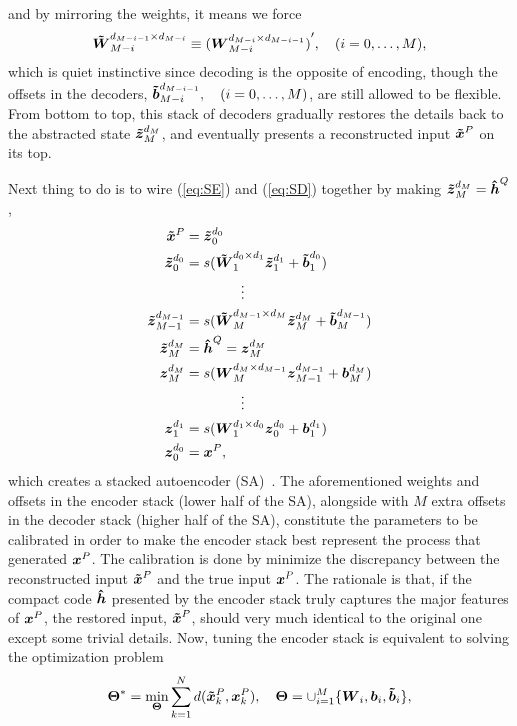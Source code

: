 and by mirroring the weights, it means we force
\begin{align}
  \boldsymbol{\tilde{W}}_{M-i}^{d_{M-i-1} \times d_{M-i}} \equiv {(\boldsymbol{W}_{M-i}^{d_{M-i} \times d_{M-i-1}})}^\prime, \quad (i=0, \dots, M),
\end{align}
which is quiet instinctive since decoding is the opposite of encoding, though the offsets in the decoders, $\boldsymbol{\tilde{b}}_{M-i}^{d_{M-i-1}}, \quad (i=0, \dots, M)$, are still allowed to be flexible. From bottom to top, this stack of decoders gradually restores the details back to the abstracted state $\boldsymbol{\tilde{z}}_{M}^{d_{M}}$, and eventually presents a reconstructed input $\boldsymbol{\tilde{x}}^P$ on its top.

Next thing to do is to wire (\ref{eq:SE}) and (\ref{eq:SD}) together by making $\boldsymbol{\tilde{z}}_{M}^{d_{M}} = \boldsymbol{\hat{h}}^Q$,
\begin{equation} \label{eq:SA}
  \begin{split}
    \boldsymbol{\tilde{x}}^P &= \boldsymbol{\tilde{z}}_{0}^{d_{0}} \\
    \boldsymbol{\tilde{z}}_{0  }^{d_{0  }} &= s(\boldsymbol{\tilde{W}}_{1  }^{d_{0  } \times d_{1  }} \boldsymbol{\tilde{z}}_{1  }^{d_{1  }} + \boldsymbol{\tilde{b}}_{1}^{d_{0  }}) \\
    & \quad \quad \quad \quad \vdots \\
    \boldsymbol{\tilde{z}}_{M-1}^{d_{M-1}} &= s(\boldsymbol{\tilde{W}}_{M  }^{d_{M-1} \times d_{M  }} \boldsymbol{\tilde{z}}_{M  }^{d_{M  }} + \boldsymbol{\tilde{b}}_{M}^{d_{M-1}}) \\
    \boldsymbol{\tilde{z}}_{M  }^{d_{M  }} &= \boldsymbol{\hat{h}}^Q = \boldsymbol{z}_{M}^{d_{M}} \\
    \boldsymbol{z}_{M  }^{d_{M  }} &= s(\boldsymbol{W}_{M  }^{d_{M  } \times d_{M-1}} \boldsymbol{z}_{M-1}^{d_{M-1}} + \boldsymbol{b}_{M}^{d_{M  }}) \\
    & \quad \quad \quad \quad \vdots \\
    \boldsymbol{z}_{1  }^{d_{1  }} &= s(\boldsymbol{W}_{1  }^{d_{1  } \times d_{0  }} \boldsymbol{z}_{0  }^{d_{0  }} + \boldsymbol{b}_{1}^{d_{1  }}) \\
    \boldsymbol{z}_{0  }^{d_{0  }} &= \boldsymbol{x}^P,
  \end{split}
\end{equation}
which creates a stacked autoencoder (SA)~\cite{DL:SDA1}. The aforementioned weights and offsets in the encoder stack (lower half of the SA), alongside with $M$ extra offsets in the decoder stack (higher half of the SA), constitute the parameters to be calibrated in order to make the encoder stack best represent the process that generated $\boldsymbol{x}^P$. The calibration is done by minimize the discrepancy between the reconstructed input $\boldsymbol{\tilde{x}}^P$ and the true input $\boldsymbol{x}^P$. The rationale is that, if the compact code $\boldsymbol{\hat{h}}$ presented by the encoder stack truly captures the major features of $\boldsymbol{x}^P$, the restored input, $\boldsymbol{\tilde{x}}^P$, should very much identical to the original one except some trivial details. Now, tuning the encoder stack is equivalent to solving the optimization problem
\begin{equation} \label{eq:CE}
  \begin{split}
    \boldsymbol{\Theta}^* = \min_{\boldsymbol{\Theta}} \sum_{k=1}^N{d(\boldsymbol{\tilde{x}}_k^P, \boldsymbol{x}_k^P)}, \quad \boldsymbol{\Theta} = \cup_{i=1}^M \{\boldsymbol{W}_i, \boldsymbol{b}_i, \boldsymbol{\tilde{b}}_i\},
  \end{split}
\end{equation}

